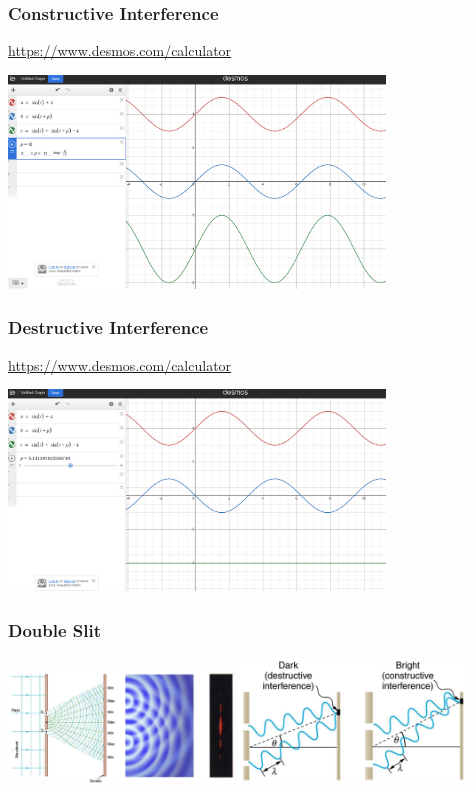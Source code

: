 \documentclass{beamer}
\begin{document}
\begin{frame}\frametitle{Constructive Interference}
\url{https://www.desmos.com/calculator}
\begin{center}
\includegraphics[width=10cm]{fig/constructive.png}
\end{center}


\end{frame}


\begin{frame}\frametitle{Destructive Interference}
\url{https://www.desmos.com/calculator}
\begin{center}
\includegraphics[width=10cm]{fig/destructive.png}
\end{center}
\end{frame}

\begin{frame}\frametitle{Double Slit}
\begin{center}
\includegraphics[width=6cm]{fig/ds1.jpg}
\includegraphics[width=6cm]{fig/ds2.jpg}
\end{center}

\end{frame}
\end{document}
